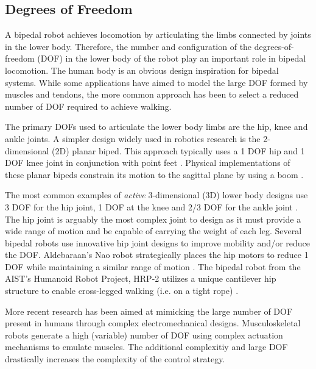 \subsection{Degrees of Freedom} %
\label{sub:related_degrees_of_freedom}
A bipedal robot achieves locomotion by articulating the limbs connected by joints in the lower body. Therefore, the number and configuration of the degrees-of-freedom (DOF) in the lower body of the robot play an important role in bipedal locomotion. The human body is an obvious design inspiration for bipedal systems. While some applications have aimed to model the large DOF formed by muscles and tendons, the more common approach has been to select a reduced number of DOF required to achieve walking. 

The primary DOFs used to articulate the lower body limbs are the hip, knee and ankle joints. A simpler design widely used in robotics research is the 2-dimensional (2D) planar biped. This approach typically uses a 1 DOF hip and 1 DOF knee joint in conjunction with point feet \cite{tzafestas1996robust}. Physical implementations of these planar bipeds constrain its motion to the sagittal plane by using a boom \cite{chevallereau2000design,pratt2001virtual,Wight:2008vt}. 

The most common examples of \emph{active} 3-dimensional (3D) lower body designs use 3 DOF for the hip joint, 1 DOF at the knee and 2/3 DOF for the ankle joint \cite{Hirai1998,IllWooPark:2005et,Kaneko:2004wq,Ogura:2006bm,yamaguchi1999}. The hip joint is arguably the most complex joint to design as it must provide a wide range of motion and be capable of carrying the weight of each leg. Several bipedal robots use innovative hip joint designs to improve mobility and/or reduce the DOF. Aldebaraan's Nao robot strategically places the hip motors to reduce 1 DOF while maintaining a similar range of motion \cite{Gouaillier:2008ug}. The bipedal robot from the AIST's Humanoid Robot Project, HRP-2 utilizes a unique cantilever hip structure to enable cross-legged walking (i.e. on a tight rope) \cite{Kaneko:2004wq}. 

More recent research has been aimed at mimicking the large number of DOF present in humans through complex electromechanical designs. Musculoskeletal robots \cite{Mizuuchi:2007em,Osada:2010cj} generate a high (variable) number of DOF using complex actuation mechanisms to emulate muscles. The additional complexitiy and large DOF drastically increases the complexity of the control strategy. 

